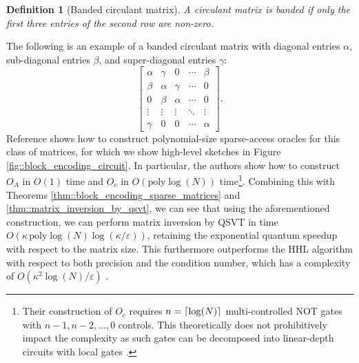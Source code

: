 \documentclass[10pt, twocolumn]{article}
\DeclarePairedDelimiter{\ceil}{\lceil}{\rceil}
\newtheorem{definition}[theorem]{Definition}
\begin{document}
\begin{definition}[Banded circulant matrix]
	A circulant matrix is banded if only the first three entries of the second row are non-zero.
\end{definition}

The following is an example of a banded circulant matrix with diagonal entries $\alpha$, sub-diagonal entries $\beta$, and super-diagonal entries $\gamma$:
\[
	\begin{bmatrix}
		\alpha & \gamma & 0 & \cdots & \beta \\
		\beta & \alpha & \gamma & \cdots & 0 \\
		0 & \beta & \alpha & \cdots & 0 \\
		\vdots & \vdots & \vdots & \ddots & \vdots \\
		\gamma & 0 & 0 & \cdots & \alpha
	\end{bmatrix}.
\]
Reference \cite{camps2203explicit} shows how to construct polynomial-size sparse-access oracles for this class of matrices, for which we show high-level sketches in Figure \ref{fig::block_encoding_circuit}. In particular, the authors show how to construct $O_A$ in $O(1)$ time and $O_c$ in $O(\text{poly}\log(N))$ time\footnote{Their construction of $O_c$ requires $n = \ceil{\log(N)}$ multi-controlled \textsc{NOT} gates with $n-1, n-2, \dots, 0$ controls. This theoretically does not prohibitively impact the complexity as such gates can be decomposed into linear-depth circuits with local gates \cite{da2022linear}.}. Combining this with Theorems \ref{thm::block_encoding_sparse_matrices} and \ref{thm::matrix_inversion_by_qsvt}, we can see that using the aforementioned construction, we can perform matrix inversion by QSVT in time $O(\kappa \, \text{poly}\log(N) \log(\kappa / \varepsilon))$, retaining the exponential quantum speedup with respect to the matrix size. This furthermore outperforms the HHL algorithm with respect to both precision and the condition number, which has a complexity of $O(\kappa^2 \log(N) / \varepsilon)$ \cite{harrow2009quantum}.
\end{document}

